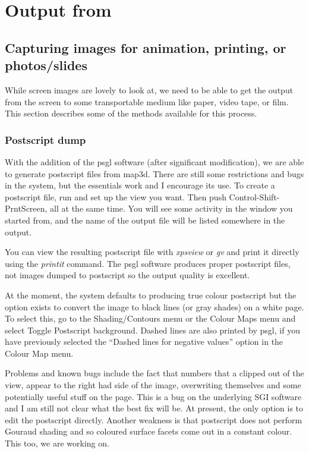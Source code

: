 \section{Output from \map{}}

\subsection{Capturing images for animation, printing, or photos/slides}
\label{sec:output} 

While screen images are lovely to look at, we need to be able to get the
output from the screen to some transportable medium like paper,
video tape, or film.  This section describes some of the methods available
for this process.

\subsubsection{Postscript dump}
\label{sec:psgl}

With the addition of the psgl software (after significant modification), we
are able to generate postscript files from map3d.  There are still some
restrictions and bugs in the system, but the essentials work and I
encourage its use.  To create a postscript file, run \map{} and set up the
view you want.  Then push Control-Shift-PrntScreen, all at the same time.
You will see some activity in the window you started \map{} from, and the
name of the output file will be listed somewhere in the output.  

You can view the resulting postscript file with {\em xpsview\/} or {\em
gv\/} and print it directly using the {\em printit\/} command.  The psgl
software produces proper postscript files, not images dumped to postscript
so the output quality is excellent.

At the moment, the system defaults to producing true colour postscript but
the option exists to convert the image to black lines (or gray shades) on a
white page.  To select this, go to the Shading/Contours menu or the Colour
Maps menu and select Toggle Postscript background.  Dashed lines are also
printed by psgl, if you have previously selected the ``Dashed lines for
negative values'' option in the Colour Map menu.

Problems and known bugs include the fact that numbers that a clipped out of
the view, appear to the right had side of the image, overwriting themselves
and some potentially useful stuff on the page.  This is a bug on the
underlying SGI software and I am still not clear what the best fix will
be.  At present, the only option is to edit the postscript directly.
Another weakness is that postscript does not perform Gouraud shading and so
coloured surface facets come out in a constant colour.  This too, we are
working on. 

